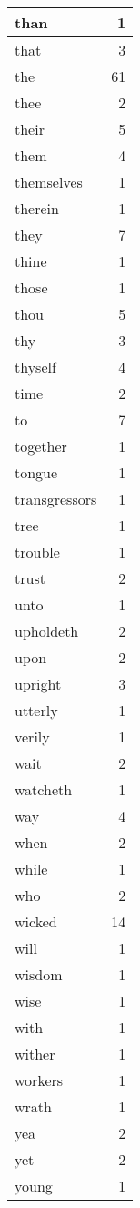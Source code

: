 \begin{center}
\begin{longtable}{l|r}
than & 1 \\ \hline
that & 3 \\ \hline
the & 61 \\ \hline
thee & 2 \\ \hline
their & 5 \\ \hline
them & 4 \\ \hline
themselves & 1 \\ \hline
therein & 1 \\ \hline
they & 7 \\ \hline
thine & 1 \\ \hline
those & 1 \\ \hline
thou & 5 \\ \hline
thy & 3 \\ \hline
thyself & 4 \\ \hline
time & 2 \\ \hline
to & 7 \\ \hline
together & 1 \\ \hline
tongue & 1 \\ \hline
transgressors & 1 \\ \hline
tree & 1 \\ \hline
trouble & 1 \\ \hline
trust & 2 \\ \hline
unto & 1 \\ \hline
upholdeth & 2 \\ \hline
upon & 2 \\ \hline
upright & 3 \\ \hline
utterly & 1 \\ \hline
verily & 1 \\ \hline
wait & 2 \\ \hline
watcheth & 1 \\ \hline
way & 4 \\ \hline
when & 2 \\ \hline
while & 1 \\ \hline
who & 2 \\ \hline
wicked & 14 \\ \hline
will & 1 \\ \hline
wisdom & 1 \\ \hline
wise & 1 \\ \hline
with & 1 \\ \hline
wither & 1 \\ \hline
workers & 1 \\ \hline
wrath & 1 \\ \hline
yea & 2 \\ \hline
yet & 2 \\ \hline
young & 1 \\ \hline
\end{longtable}
\end{center}



